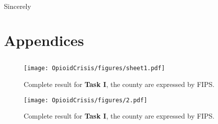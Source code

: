 \documentclass[a4paper]{article}
\begin{document}
\noindent \textsf{Sincerely}
\clearpage
\renewcommand{\baselinestretch}{1.0}



\clearpage

\section*{\Large{Appendices}}

\subsection*{}
\begin{figure}[h]
  \small
  \centering
  \texttt{[image: OpioidCrisis/figures/sheet1.pdf]}
  \caption{Complete result for \textbf{Task I}, the county are expressed by FIPS.}
\end{figure}

\begin{figure}[h]
  \small
  \centering
  \texttt{[image: OpioidCrisis/figures/2.pdf]}
  \caption{Complete result for \textbf{Task I}, the county are expressed by FIPS.}
\end{figure}
\end{document}
